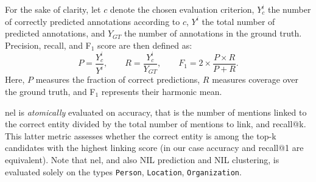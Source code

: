 
For the sake of clarity, let $c$ denote the chosen evaluation criterion, $Y^i_c$ the number of correctly predicted annotations according to $c$, $Y^i$ the total number of predicted annotations, and $Y_{GT}$ the number of annotations in the ground truth.  
Precision, recall, and F$_1$ score are then defined as:
\begin{equation}
P = \frac{Y^i_c}{Y^i}, \qquad
R = \frac{Y^i_c}{Y_{GT}}, \qquad
F_1 = 2 \times \frac{P \times R}{P + R}.
\end{equation}
Here, $P$ measures the fraction of correct predictions, $R$ measures coverage over the ground truth, and F$_1$ represents their harmonic mean.






\ac{nel} is \textit{atomically} evaluated on accuracy, that is the number of mentions linked to the correct entity divided by the total number of mentions to link, and recall@k. This latter metric assesses whether the correct entity is among the top-k candidates with the highest linking score (in our case accuracy and recall@1 are equivalent). Note that \ac{nel}, and also NIL prediction and NIL clustering, is evaluated solely on the types \texttt{Person}, \texttt{Location}, \texttt{Organization}. 

